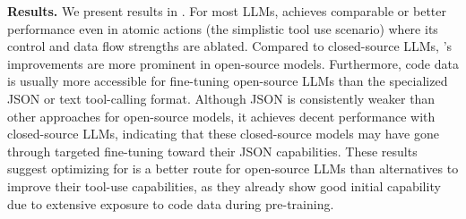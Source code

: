 \noindent \textbf{Results.}
We present results in . 
% 
For most LLMs, \approach achieves comparable or better performance even in atomic actions (the simplistic tool use scenario) where its control and data flow strengths are ablated.
% 
Compared to closed-source LLMs, \approach's improvements are more prominent in open-source models. Furthermore, code data is usually more accessible for fine-tuning open-source LLMs than the specialized JSON or text tool-calling format.
% 
Although JSON is consistently weaker than other approaches for open-source models, it achieves decent performance with closed-source LLMs, indicating that these closed-source models may have gone through targeted fine-tuning toward their JSON capabilities.
% 
These results suggest optimizing for \approach is a better route for open-source LLMs than alternatives to improve their tool-use capabilities, as they already show good initial \approach capability due to extensive exposure to code data during pre-training.

